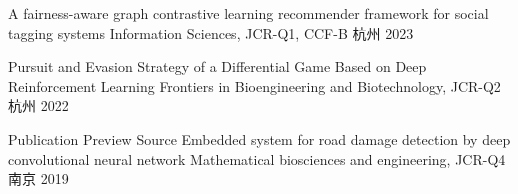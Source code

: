 


\begin{cvhonors}
\cvhonor
  {A fairness-aware graph contrastive learning recommender framework for social tagging systems} %
  {Information Sciences, JCR-Q1, CCF-B} %
  {杭州} %
  {2023} %

\cvhonor
  {Pursuit and Evasion Strategy of a Differential Game Based on Deep Reinforcement Learning} %
  {Frontiers in Bioengineering and Biotechnology, JCR-Q2} %
  {杭州} %
  {2022} %

\cvhonor
  {Publication Preview Source Embedded system for road damage detection by deep convolutional neural network} %
  {Mathematical biosciences and engineering, JCR-Q4} %
  {南京} %
  {2019} %

\end{cvhonors}

